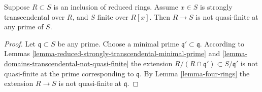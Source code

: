 \begin{lemma}
\label{lemma-reduced-strongly-transcendental-not-quasi-finite}
Suppose $R \subset S$ is an inclusion of reduced rings.
Assume $x \in S$ is strongly transcendental over $R$,
and $S$ finite over $R[x]$. Then $R \to S$ is not
quasi-finite at any prime of $S$.
\end{lemma}

\begin{proof}
Let $\mathfrak q \subset S$ be any prime.
Choose a minimal prime $\mathfrak q' \subset \mathfrak q$.
According to Lemmas
\ref{lemma-reduced-strongly-transcendental-minimal-prime} and
\ref{lemma-domains-transcendental-not-quasi-finite}
the extension $R/(R \cap \mathfrak q') \subset
S/\mathfrak q'$ is not quasi-finite at the prime corresponding
to $\mathfrak q$. By Lemma \ref{lemma-four-rings}
the extension $R \to S$ is not quasi-finite
at $\mathfrak q$.
\end{proof}
